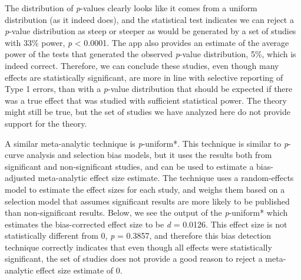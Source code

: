 \documentclass[
  oneside]{krantz}
\makeatletter
\newenvironment{Shaded}{\begin{snugshade}}{\end{snugshade}}
\newcommand{\AttributeTok}[1]{\textcolor[rgb]{0.61,0.61,0.61}{#1}}
\newcommand{\FunctionTok}[1]{\textcolor[rgb]{0,0,0}{#1}}
\newcommand{\NormalTok}[1]{#1}
\newcommand{\SpecialCharTok}[1]{\textcolor[rgb]{0,0,0}{#1}}
\newcommand{\StringTok}[1]{\textcolor[rgb]{0.5,0.5,0.5}{#1}}
\newenvironment{kframe}{%
\medskip{}
\setlength{\fboxsep}{.8em}
 \def\at@end@of@kframe{}%
 \ifinner\ifhmode%
  \def\at@end@of@kframe{\end{minipage}}%
  \begin{minipage}{\columnwidth}%
 \fi\fi%
 \def\FrameCommand##1{\hskip\@totalleftmargin \hskip-\fboxsep
 \colorbox{shadecolor}{##1}\hskip-\fboxsep
     \hskip-\linewidth \hskip-\@totalleftmargin \hskip\columnwidth}%
 \MakeFramed {\advance\hsize-\width
   \@totalleftmargin\z@ \linewidth\hsize
   \@setminipage}}%
 {\par\unskip\endMakeFramed%
 \at@end@of@kframe}
\renewenvironment{Shaded}{\begin{kframe}}{\end{kframe}}
\makeatother
\begin{document}
The distribution of \emph{p}-values clearly looks like it comes from a uniform distribution (as it indeed does), and the statistical test indicates we can reject a \emph{p}-value distribution as steep or steeper as would be generated by a set of studies with 33\% power, \emph{p} \textless{} 0.0001. The app also provides an estimate of the average power of the tests that generated the observed \emph{p}-value distribution, 5\%, which is indeed correct. Therefore, we can conclude these studies, even though many effects are statistically significant, are more in line with selective reporting of Type 1 errors, than with a \emph{p}-value distribution that should be expected if there was a true effect that was studied with sufficient statistical power. The theory might still be true, but the set of studies we have analyzed here do not provide support for the theory.

A similar meta-analytic technique is \emph{p}-uniform*. This technique is similar to \emph{p}-curve analysis and selection bias models, but it uses the results both from significant and non-significant studies, and can be used to estimate a bias-adjusted meta-analytic effect size estimate. The technique uses a random-effects model to estimate the effect sizes for each study, and weighs them based on a selection model that assumes significant results are more likely to be published than non-significant results. Below, we see the output of the \emph{p}-uniform* which estimates the bias-corrected effect size to be \emph{d} = 0.0126. This effect size is not statistically different from 0, \emph{p} = 0.3857, and therefore this bias detection technique correctly indicates that even though all effects were statistically significant, the set of studies does not provide a good reason to reject a meta-analytic effect size estimate of 0.

\begin{Shaded}
\end{Shaded}
\end{document}
